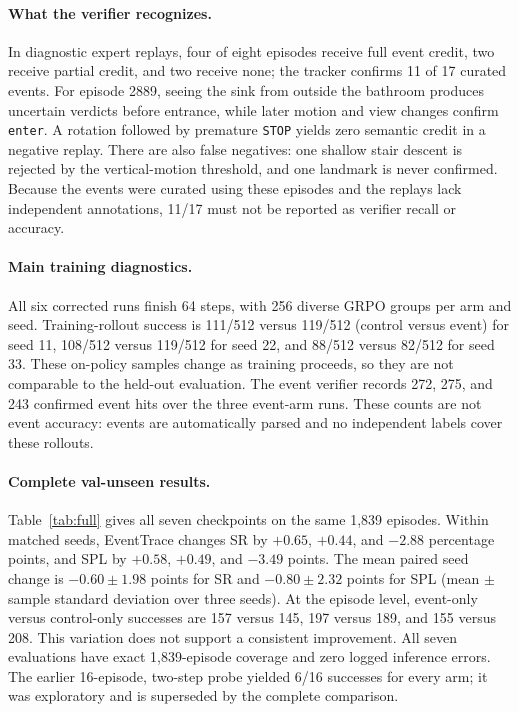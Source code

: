 \documentclass[10pt,twocolumn,letterpaper]{article}
\begin{document}
\paragraph{What the verifier recognizes.} In diagnostic expert replays, four of eight episodes receive full event credit, two receive partial credit, and two receive none; the tracker confirms 11 of 17 curated events. For episode 2889, seeing the sink from outside the bathroom produces uncertain verdicts before entrance, while later motion and view changes confirm \texttt{enter}. A rotation followed by premature \texttt{STOP} yields zero semantic credit in a negative replay. There are also false negatives: one shallow stair descent is rejected by the vertical-motion threshold, and one landmark is never confirmed. Because the events were curated using these episodes and the replays lack independent annotations, 11/17 must not be reported as verifier recall or accuracy.

\paragraph{Main training diagnostics.} All six corrected runs finish 64 steps, with 256 diverse GRPO groups per arm and seed. Training-rollout success is 111/512 versus 119/512 (control versus event) for seed 11, 108/512 versus 119/512 for seed 22, and 88/512 versus 82/512 for seed 33. These on-policy samples change as training proceeds, so they are not comparable to the held-out evaluation. The event verifier records 272, 275, and 243 confirmed event hits over the three event-arm runs. These counts are not event accuracy: events are automatically parsed and no independent labels cover these rollouts.

\paragraph{Complete val-unseen results.} Table~\ref{tab:full} gives all seven checkpoints on the same 1,839 episodes. Within matched seeds, EventTrace changes SR by $+0.65$, $+0.44$, and $-2.88$ percentage points, and SPL by $+0.58$, $+0.49$, and $-3.49$ points. The mean paired seed change is $-0.60\pm1.98$ points for SR and $-0.80\pm2.32$ points for SPL (mean $\pm$ sample standard deviation over three seeds). At the episode level, event-only versus control-only successes are 157 versus 145, 197 versus 189, and 155 versus 208. This variation does not support a consistent improvement. All seven evaluations have exact 1,839-episode coverage and zero logged inference errors. The earlier 16-episode, two-step probe yielded 6/16 successes for every arm; it was exploratory and is superseded by the complete comparison.
\end{document}
